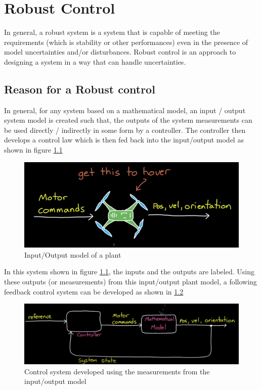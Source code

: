 \chapter{Robust Control}

In general, a robust system is a system that is capable of meeting the requirements (which is stability or other performances) even in the presence of model uncertainties and/or disturbances. Robust control is an approach to designing a system in a way that can handle uncertainties. 

\section{Reason for a Robust control}

In general, for any system based on a mathematical model, an input / output system model is created such that, the outputs of the system measurements can be used directly / indirectly in some form by a controller. The controller then develops a control law which is then fed back into the input/output model as shown in figure \ref{fig_RobustControlReasons1}
\begin{figure}[h!]
	\centering
	\includegraphics[width=0.6\linewidth]{Bilder/RobustControlReasons1.png}
	\caption{Input/Output model of a plant}
	\label{fig_RobustControlReasons1}
\end{figure}
In this system shown in figure \ref{fig_RobustControlReasons1}, the inputs and the outputs are labeled. Using these outputs (or measurements) from this input/output plant model, a following feedback control system can be developed as shown in \ref{fig_RobustControlReasons2}
\begin{figure}[h!]
	\centering
	\includegraphics[width=0.6\linewidth]{Bilder/RobustControlSystemReason2.png}
	\caption{Control system developed using the measurements from the input/output model}
	\label{fig_RobustControlReasons2}
\end{figure}
